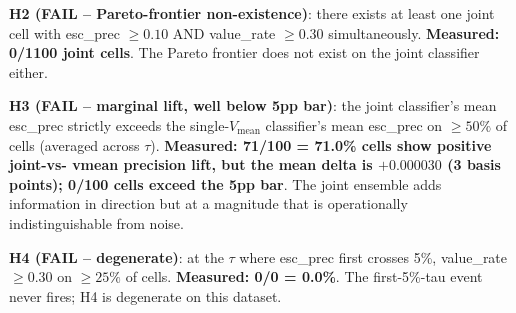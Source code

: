 \documentclass{article}
\begin{document}
\textbf{H2 (FAIL -- Pareto-frontier non-existence)}: there exists at
least one joint cell with esc\_prec $\geq 0.10$ AND value\_rate
$\geq 0.30$ simultaneously. \textbf{Measured: 0/1100 joint cells}.
The Pareto frontier does not exist on the joint classifier either.

\textbf{H3 (FAIL -- marginal lift, well below 5pp bar)}: the joint
classifier's mean esc\_prec strictly exceeds the single-$V_\mathrm{mean}$
classifier's mean esc\_prec on $\geq 50\%$ of cells (averaged across
$\tau$). \textbf{Measured: 71/100 = 71.0\% cells show positive joint-vs-
vmean precision lift, but the mean delta is $+0.000030$ (3 basis
points); 0/100 cells exceed the 5pp bar}. The joint ensemble adds
information in direction but at a magnitude that is operationally
indistinguishable from noise.

\textbf{H4 (FAIL -- degenerate)}: at the $\tau$ where esc\_prec first
crosses 5\%, value\_rate $\geq 0.30$ on $\geq 25\%$ of cells.
\textbf{Measured: 0/0 = 0.0\%}. The first-5\%-tau event never fires;
H4 is degenerate on this dataset.
\end{document}
